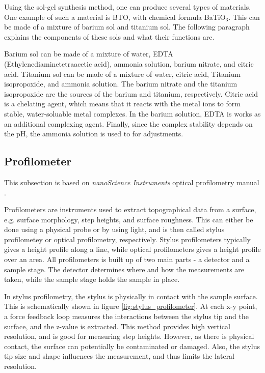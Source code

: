 \noindent Using the sol-gel synthesis method, one can produce several types of materials.
One example of such a material is BTO, with chemical formula BaTiO$_3$. 
This can be made of a mixture of barium sol and titanium sol.
The following paragraph explains the components of these sols and what their functions are.

Barium sol can be made of a mixture of water, EDTA (Ethylenediaminetetraacetic acid), ammonia solution, barium nitrate, and citric acid.
Titanium sol can be made of a mixture of water, citric acid, Titanium isopropoxide, and ammonia solution.
The barium nitrate and the titanium isopropoxide are the sources of the barium and titanium, respectively.
Citric acid is a chelating agent, which means that it reacts with the metal ions to form stable, water-soluable metal complexes.
In the barium solution, EDTA is works as an additional complexing agent.
Finally, since the complex stability depends on the pH, the ammonia solution is used to for adjustments.

\subsection{Profilometer}

\noindent This subsection is based on \textit{nanoScience Instruments} optical profilometry manual \cite{profilometer_manual}.

Profilometers are instruments used to extract topographical data from a surface, e.g. surface morphology, step heights, and surface roughness.
This can either be done using a physical probe or by using light, and is then called stylus profilometey or optical profilometry, respectively.
Stylus profilometers typically gives a height profile along a line, while optical profilometers gives a height profile over an area.
All profilometers is built up of two main parts - a detector and a sample stage.
The detector determines where and how the measurements are taken, while the sample stage holds the sample in place.

In stylus profilometry, the stylus is physically in contact with the sample surface.
This is schematically shown in figure \autoref{fig:stylus_profilometer}.
At each x-y point, a force feedback loop measures the interactions between the stylus tip and the surface, and the z-value is extracted.
This method provides high vertical resolution, and is good for measuring step heights.
However, as there is physical contact, the surface can potentially be contaminated or damaged.
Also, the stylus tip size and shape influences the measurement, and thus limits the lateral resolution.


